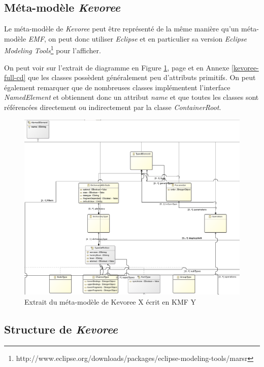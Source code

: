 \subsection{\label{mm-kevoree}Méta-modèle \emph{Kevoree}}

Le méta-modèle de \emph{Kevoree} peut être représenté de la même manière qu'un méta-modèle \emph{EMF}, on peut donc utiliser \emph{Eclipse}\cite{eclipse} et en particulier sa version \emph{Eclipse Modeling Tools}\footnote{http://www.eclipse.org/downloads/packages/eclipse-modeling-tools/marsr} pour l'afficher. 

On peut voir sur l'extrait de diagramme en Figure \ref{kevoree-cd}, page \pageref{kevoree-cd} et en Annexe \ref{kevoree-full-cd} que les classes possèdent généralement peu d'attributs primitifs. On peut également remarquer que de nombreuses classes implémentent l'interface \emph{NamedElement} et obtiennent donc un attribut \emph{name} et que toutes les classes sont référencées directement ou indirectement par la classe \emph{ContainerRoot}.

\begin{figure}[ht!]
\centering
\includegraphics[scale=0.4]{images/kevoree-cd.png}
\caption{Extrait du méta-modèle de Kevoree X écrit en KMF Y}
\label{kevoree-cd}
\end{figure}

\subsection{Structure de \emph{Kevoree}}

